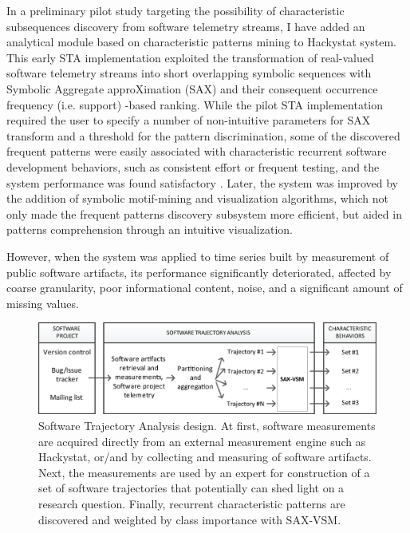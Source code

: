 In a preliminary pilot study targeting the possibility of characteristic subsequences discovery from 
software telemetry streams, I have added an analytical module based on characteristic patterns mining 
to Hackystat system. This early STA implementation exploited the transformation of real-valued software 
telemetry streams into short overlapping symbolic sequences with Symbolic Aggregate approXimation 
(SAX) \cite{sax} and their consequent occurrence frequency (i.e. support) -based ranking. 
While the pilot STA implementation required the user to specify a number of non-intuitive parameters for 
SAX transform and a threshold for the pattern discrimination, some of the discovered frequent patterns 
were easily associated with characteristic recurrent software development behaviors, such as consistent 
effort or frequent testing, and the system performance was found satisfactory \cite{csdl2-10-09}.
Later, the system was improved by the addition of symbolic motif-mining and visualization algorithms, 
which not only made the frequent patterns discovery subsystem more efficient, 
but aided in patterns comprehension through an intuitive visualization. 

However, when the system was applied to time series built by measurement of public software artifacts, 
its performance significantly deteriorated, affected by coarse granularity, poor informational content,
noise, and a significant amount of missing values. 

\begin{figure}[t]
   \centering
   \includegraphics[width=150mm]{figures/STA_overview.eps}
   \caption{Software Trajectory Analysis design. 
    At first, software measurements are acquired directly from an external measurement engine such as Hackystat, 
    or/and by collecting and measuring of software artifacts.
    Next, the measurements are used by an expert for construction of a set of software trajectories that 
    potentially can shed light on a research question. 
    Finally, recurrent characteristic patterns are discovered and weighted by class importance with SAX-VSM.}
   \label{fig:sta-overview}
\end{figure}

